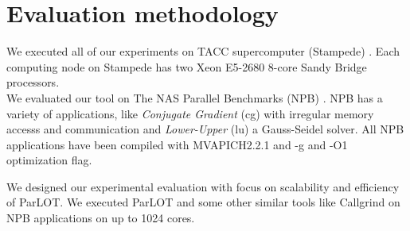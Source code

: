 \section{Evaluation methodology}
We executed all of our experiments on TACC supercomputer (Stampede)\cite{tacc-url} . Each computing node on Stampede has two Xeon E5-2680 8-core Sandy Bridge processors.\\

We evaluated our tool on The NAS Parallel Benchmarks (NPB) \cite{nas}. NPB has a variety of applications, like \textit{Conjugate Gradient} (cg) with irregular memory accesss and communication and \textit{Lower-Upper} (lu) a Gauss-Seidel solver.
All NPB applications have been compiled with MVAPICH2.2.1 and -g and -O1 optimization flag.

We designed our experimental evaluation  with focus on scalability and efficiency of ParLOT. We executed ParLOT and some other similar tools like Callgrind on NPB applications on up to 1024 cores.
